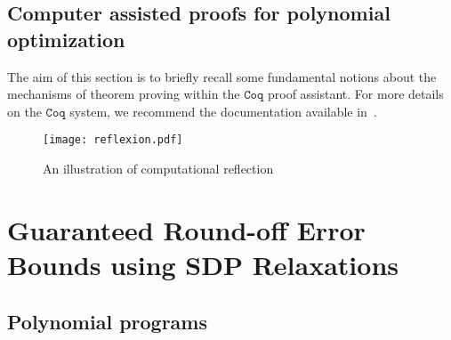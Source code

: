 \documentclass[a4paper,10pt]{article}
\newcommand{\coq}{\mathtt{Coq}}
\theoremstyle{plain}
\theoremstyle{definition}
\theoremstyle{remark}
\begin{document}
\subsection{Computer assisted proofs for polynomial optimization}
\label{sec:coqbackground}
The aim of this section is to briefly recall some fundamental notions
about the mechanisms of theorem proving within the $\coq$ proof
assistant. For more details on the $\coq$ system, we recommend the
documentation available in~\cite{bertot2004interactive}.


\begin{figure}[!ht]
\centering
\texttt{[image: reflexion.pdf]}
\caption{An illustration of computational reflection}	
\label{fig:reflexion}
\end{figure}

\section{Guaranteed Round-off Error Bounds using SDP Relaxations}
\label{sec:fpsdp}

\subsection{Polynomial programs}
\end{document}
